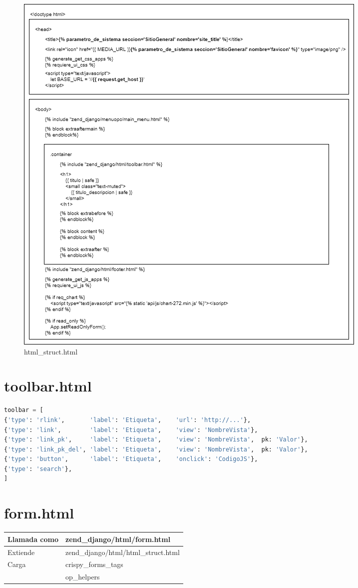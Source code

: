 \begin{figure}[H]
	\centering
	\includegraphics[scale=0.65]{./diagram/html_struct_html}
	\caption{html\_struct.html}
\end{figure}

\section{toolbar.html}

\begin{lstlisting}[language=Python]
toolbar = [
{'type': 'rlink',       'label': 'Etiqueta',    'url': 'http://...'},
{'type': 'link',        'label': 'Etiqueta',    'view': 'NombreVista'},
{'type': 'link_pk',     'label': 'Etiqueta',    'view': 'NombreVista',  pk: 'Valor'},
{'type': 'link_pk_del', 'label': 'Etiqueta',    'view': 'NombreVista',  pk: 'Valor'},
{'type': 'button',      'label': 'Etiqueta',    'onclick': 'CodigoJS'},
{'type': 'search'},
]
\end{lstlisting}

\section{form.html}

\begin{tabular}{|l|l|}
	\hline
	Llamada como & zend\_django/html/form.html \\
	\hline
	Extiende & zend\_django/html/html\_struct.html \\
	\hline
	Carga & crispy\_forms\_tags \\
	& op\_helpers \\
	\hline
\end{tabular}

